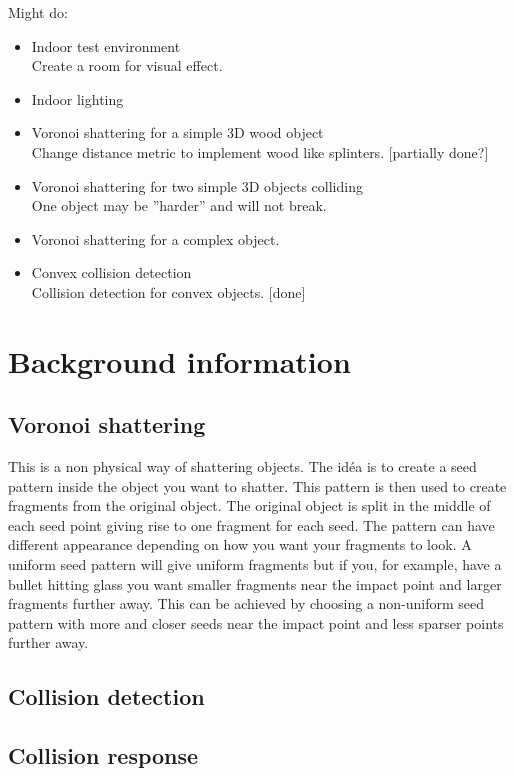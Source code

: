 \documentclass[10pt]{article}
\begin{document}
Might do:
\begin{itemize}

  \item Indoor test environment \hfill \\
  Create a room for visual effect.
  \item Indoor lighting
  \item Voronoi shattering for a simple 3D wood object \hfill \\
  Change distance metric to implement wood like splinters. [partially done?]
  \item Voronoi shattering for two simple 3D objects colliding \hfill \\
  One object may be ”harder” and will not break.
  \item Voronoi shattering for a complex object.
  \item Convex collision detection \hfill \\
  Collision detection for convex objects. [done]

\end{itemize}

\section{Background information}
\subsection{Voronoi shattering}
This is a non physical way of shattering objects. The idéa is to create a
seed pattern inside the object you want to shatter. This pattern is then used
to create fragments from the original object. The original object is split
in the middle of each seed point giving rise to one fragment for each
seed. The pattern can have different appearance depending on how you want your
fragments to look. A uniform seed pattern will give uniform fragments but if
you, for example, have a bullet hitting glass you want smaller fragments near
the impact point and larger fragments further away. This can be achieved by
choosing a non-uniform seed pattern with more and closer seeds near the impact
point and less sparser points further away.

\subsection{Collision detection}

\subsection{Collision response}
\end{document}
